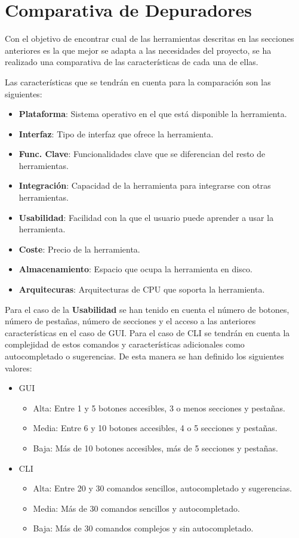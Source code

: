 \section{Comparativa de Depuradores}\label{sec:comparativa-depuradores}
Con el objetivo de encontrar cual de las herramientas descritas en las secciones anteriores es la que mejor se adapta a las necesidades del proyecto, se ha realizado una comparativa de las características de cada una de ellas. 

Las características que se tendrán en cuenta para la comparación son las siguientes:
\begin{itemize}
  \item \textbf{Plataforma}: Sistema operativo en el que está disponible la herramienta.
  \item \textbf{Interfaz}: Tipo de interfaz que ofrece la herramienta.
  \item \textbf{Func. Clave}: Funcionalidades clave que se diferencian del resto de herramientas.
  \item \textbf{Integración}: Capacidad de la herramienta para integrarse con otras herramientas.
  \item \textbf{Usabilidad}: Facilidad con la que el usuario puede aprender a usar la herramienta.
  \item \textbf{Coste}: Precio de la herramienta.
  \item \textbf{Almacenamiento}: Espacio que ocupa la herramienta en disco.
  \item \textbf{Arquitecuras}: Arquitecturas de \gls{CPU} que soporta la herramienta.
\end{itemize}

Para el caso de la \textbf{Usabilidad} se han tenido en cuenta el número de botones, número de pestañas, número de secciones y el acceso a las anteriores características en el caso de \gls{GUI}. Para el caso de \gls{CLI} se tendrán en cuenta la complejidad de estos comandos y características adicionales como autocompletado o sugerencias. De esta manera se han definido los siguientes valores:
\begin{itemize}
    \item \gls{GUI}
        \begin{itemize}
            \item Alta: Entre 1 y 5 botones accesibles, 3 o menos secciones y pestañas.
            \item Media: Entre 6 y 10 botones accesibles, 4 o 5 secciones y pestañas.
            \item Baja: Más de 10 botones accesibles, más de 5 secciones y pestañas.
        \end{itemize}
    \item \gls{CLI}
        \begin{itemize}
            \item Alta: Entre 20 y 30 comandos sencillos, autocompletado y sugerencias.
            \item Media: Más de 30 comandos sencillos y autocompletado.
            \item Baja: Más de 30 comandos complejos y sin autocompletado.
        \end{itemize}
\end{itemize}


